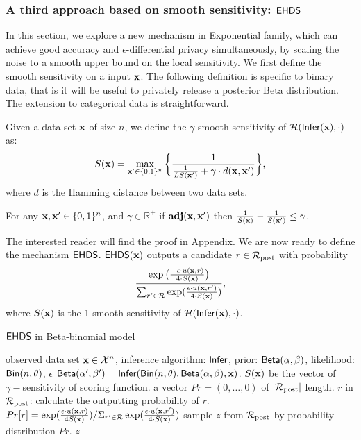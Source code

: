 \documentclass{article}
\begin{document}
\subsubsection{A third approach based on smooth sensitivity: $\mathsf{EHDS}$}
\label{sec_ehds}
In this section, we explore a new mechanism in Exponential family, which can achieve good accuracy and $\epsilon$-differential privacy simultaneously,
by scaling the noise to a smooth upper bound on the local sensitivity.
We first define the smooth sensitivity on a input $\textbf{x}$. The following definition is specific to binary data, that is it will
be useful to privately release a posterior Beta distribution. The extension to categorical data is straightforward.
\begin{definition}
\label{def_gamma_smooth}
Given a data set $\textbf{x}$ of size $n$, we define the $\gamma$-smooth sensitivity of $\mathcal{H}(\mathsf{Infer}(\textbf{x}),\cdot)$ as:
\begin{equation}
  \label{eq_smooth}
   S(\textbf{x})=\max_{\textbf{x}' \in \{0,1\}^{n}}\bigg \{ \frac{1}{\frac{1}{LS(\textbf{x}')} +\gamma \cdot d(\textbf{x},\textbf{x}')} \bigg \},
\end{equation}
where $d$ is the Hamming distance between two data sets.
\end{definition}

\begin{thm}
  \label{thm_gamma_smooth}
  For any $\textbf{x}, \textbf{x}'\in\{0,1\}^n$, and $\gamma \in \mathbb{R}^{+}$
  if  $\textbf{adj}(\textbf{x},\textbf{x}')$ then $\frac{1}{S(\textbf{x})} - \frac{1}{S(\textbf{x}')} \leq \gamma$.
\end{thm}
The interested reader will find the proof in Appendix.
We are now ready to define the mechanism $\mathsf{EHDS}$. $\mathsf{EHDS}(\textbf{x})$ outputs a candidate $r \in \mathcal{R}_{\textup{post}}$ with probability
\[
  \frac {\exp\big(\frac{-\epsilon\cdot u(\textbf{x}, {r})}{4\cdot S(\textbf{x})}\big)}
  {\sum_{r' \in \mathcal{R}}\exp(\frac{\epsilon\cdot u(\textbf{x}, {r'})}{4\cdot S(\textbf{x})})},
\]
where $S(\textbf{x})$ is the 1-smooth sensitivity of  $\mathcal{H}(\mathsf{Infer}(\textbf{x}),\cdot)$. {\color{red}{why do we choose 1???}}
  \begin{algorithm}
  \caption{$\mathsf{EHDS}$ in Beta-binomial model}
  \label{mech:expmech}
  \begin{algorithmic}
  \INPUT observed data set $\textbf{x} \in \mathcal{X}^n$, inference algorithm: $\mathsf{Infer}$, 
  prior: $\mathsf{Beta}(\alpha, \beta)$, likelihood: $\mathsf{Bin}(n, \theta)$, $\epsilon$
  \STATE {} $\mathsf{Beta}(\alpha', \beta') = \mathsf{Infer}(\mathsf{Bin}(n, \theta), \mathsf{Beta}(\alpha, \beta), \textbf{x})$. $S(\textbf{x})$ be the vector of $\gamma-$sensitivity of scoring function. 
  \STATE {} a vector $Pr = (0, \dots, 0 )$ of $|\mathcal{R}_{\textup{post}}|$ length.
  \STATE {} $r$ in $\mathcal{R}_{\textup{post}}$:
  \STATE \quad \quad calculate the outputting probability of $r$.
  \STATE \quad \quad $Pr[r] = 
  {\exp(\frac{\epsilon \cdot u(\textbf{x}, {r})}{4 S(\textbf{x})})}
/ {\Sigma_{r' \in \mathcal{R}}\exp(\frac{\epsilon \cdot u(\textbf{x}, {r'})}{4 \cdot S(\textbf{x})})}$
\STATE \quad sample $z$ from $\mathcal{R}_{\textup{post}}$ by probability distribution $Pr$.
   $z$
  \end{algorithmic}
  \end{algorithm}
\end{document}
